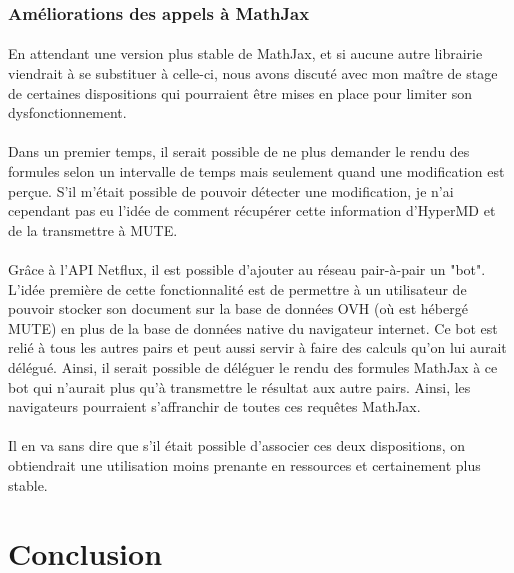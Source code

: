 \documentclass[12pt]{article}
\begin{document}
\subsubsection{Améliorations des appels à MathJax}
\paragraph{}
En attendant une version plus stable de MathJax, et si aucune autre librairie viendrait à se substituer à celle-ci, nous avons discuté avec mon maître de stage de certaines dispositions qui pourraient être mises en place pour limiter son dysfonctionnement.
\paragraph{}
Dans un premier temps, il serait possible de ne plus demander le rendu des formules selon un intervalle de temps mais seulement quand une modification est perçue. S'il m'était possible de pouvoir détecter une modification, je n'ai cependant pas eu l'idée de comment récupérer cette information d'HyperMD et de la transmettre à MUTE.
\paragraph{}
Grâce à l'API Netflux, il est possible d'ajouter au réseau pair-à-pair un "bot". L'idée première de cette fonctionnalité est de permettre à un utilisateur de pouvoir stocker son document sur la base de données OVH (où est hébergé MUTE) en plus de la base de données native du navigateur internet. Ce bot est relié à tous les autres pairs et peut aussi servir à faire des calculs qu'on lui aurait délégué. Ainsi, il serait possible de déléguer le rendu des formules MathJax à ce bot qui n'aurait plus qu'à transmettre le résultat aux autre pairs. Ainsi, les navigateurs pourraient s'affranchir de toutes ces requêtes MathJax.
\paragraph{}
Il en va sans dire que s'il était possible d'associer ces deux dispositions, on obtiendrait une utilisation moins prenante en ressources et certainement plus stable.\\

\newpage
{}
\section*{Conclusion}
\end{document}
